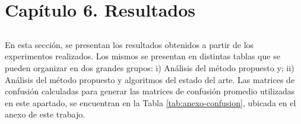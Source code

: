 \chapter*{Capítulo 6. \textbf{Resultados}}\label{ch:resultados}

\section*{}
\addtocounter{section}{1}
\setcounter{subsection}{0}

En esta sección, se presentan los resultados obtenidos a partir de los experimentos realizados. Los mismos se presentan en distintas tablas que se pueden organizar en dos grandes grupos: i) Análisis del método propuesto y; ii) Análisis del método propuesto y algoritmos del estado del arte. Las matrices de confusión calculadas para generar las matrices de confusión promedio utilizadas en este apartado, se encuentran en la Tabla \ref{tab:anexo-confusion}, ubicada en el anexo de este trabajo.






